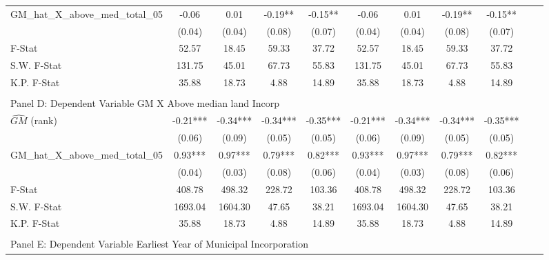 \begin{table}[htbp]
\begin{threeparttable}
\begin{tabular}{l*{10}{c}}
\addlinespace
GM\_hat\_X\_above\_med\_total\_05&      -0.06   &       0.01   &      -0.19** &      -0.15** &      -0.06   &       0.01   &      -0.19** &      -0.15** \\
                &     (0.04)   &     (0.04)   &     (0.08)   &     (0.07)   &     (0.04)   &     (0.04)   &     (0.08)   &     (0.07)   \\
\midrule
F-Stat          &      52.57   &      18.45   &      59.33   &      37.72   &      52.57   &      18.45   &      59.33   &      37.72   \\
S.W. F-Stat     &     131.75   &      45.01   &      67.73   &      55.83   &     131.75   &      45.01   &      67.73   &      55.83   \\
K.P. F-Stat     &      35.88   &      18.73   &       4.88   &      14.89   &      35.88   &      18.73   &       4.88   &      14.89   \\
\cmidrule[\heavyrulewidth](lr){1-9} \\ \cmidrule[\heavyrulewidth](lr){1-9}
\multicolumn{8}{l}{Panel D: Dependent Variable GM X Above median land Incorp}\\
\cmidrule(lr){1-9}
$\hat{GM}$ (rank)&      -0.21***&      -0.34***&      -0.34***&      -0.35***&      -0.21***&      -0.34***&      -0.34***&      -0.35***\\
                &     (0.06)   &     (0.09)   &     (0.05)   &     (0.05)   &     (0.06)   &     (0.09)   &     (0.05)   &     (0.05)   \\
\addlinespace
GM\_hat\_X\_above\_med\_total\_05&       0.93***&       0.97***&       0.79***&       0.82***&       0.93***&       0.97***&       0.79***&       0.82***\\
                &     (0.04)   &     (0.03)   &     (0.08)   &     (0.06)   &     (0.04)   &     (0.03)   &     (0.08)   &     (0.06)   \\
\midrule
F-Stat          &     408.78   &     498.32   &     228.72   &     103.36   &     408.78   &     498.32   &     228.72   &     103.36   \\
S.W. F-Stat     &    1693.04   &    1604.30   &      47.65   &      38.21   &    1693.04   &    1604.30   &      47.65   &      38.21   \\
K.P. F-Stat     &      35.88   &      18.73   &       4.88   &      14.89   &      35.88   &      18.73   &       4.88   &      14.89   \\
\cmidrule[\heavyrulewidth](lr){1-9} \\ \cmidrule[\heavyrulewidth](lr){1-9}
\multicolumn{8}{l}{Panel E: Dependent Variable Earliest Year of Municipal Incorporation}\\

\end{tabular}
\end{threeparttable}
\end{table}
